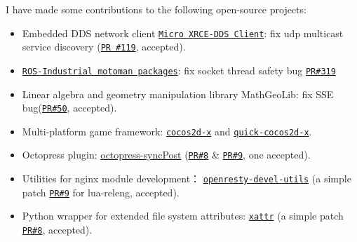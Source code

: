 \documentclass[letterpaper]{article}
\begin{document}
I have made some contributions to the following open-source projects:
\begin{itemize}
    \item Embedded DDS network client \href{https://github.com/eProsima/Micro-XRCE-DDS-Client}{\tt Micro XRCE-DDS Client}: fix udp multicast service discovery (\href{https://github.com/eProsima/Micro-XRCE-DDS-Client/pull/119}{\tt PR \#119}, accepted).
    \item \href{https://github.com/ros-industrial/motoman}{\tt ROS-Industrial motoman packages}: fix socket thread safety bug \href{https://github.com/ros-industrial/motoman/pull/319}{\tt PR\#319}
    \item Linear algebra and geometry manipulation library MathGeoLib: fix SSE bug(\href{https://github.com/juj/MathGeoLib/pull/50}{\tt PR\#50}, accepted).
    \item Multi-platform game framework: \href{https://github.com/cocos2d/cocos2d-x}{\tt cocos2d-x} and \href{https://github.com/dualface/v3quick}{\tt quick-cocos2d-x}.
    \item Octopress plugin: \href{https://github.com/huangbowen521/octopress-syncPost}{octopress-syncPost} (\href{https://github.com/huangbowen521/octopress-syncPost/pull/8}{\tt PR\#8} \& \href{https://github.com/huangbowen521/octopress-syncPost/pull/9}{\tt PR\#9}, one accepted).
    \item Utilities for nginx module development： \href{https://github.com/openresty/openresty-devel-utils}{\tt openresty-devel-utils} (a simple patch \href{https://github.com/openresty/openresty-devel-utils/pull/9}{\tt PR\#9} for lua-releng, accepted).
    \item Python wrapper for extended file system attributes: \href{https://github.com/xattr/xattr}{\tt xattr} (a simple patch \href{https://github.com/xattr/xattr/issues/8}{\tt PR\#8}, accepted).
\end{itemize}

\end{document}
